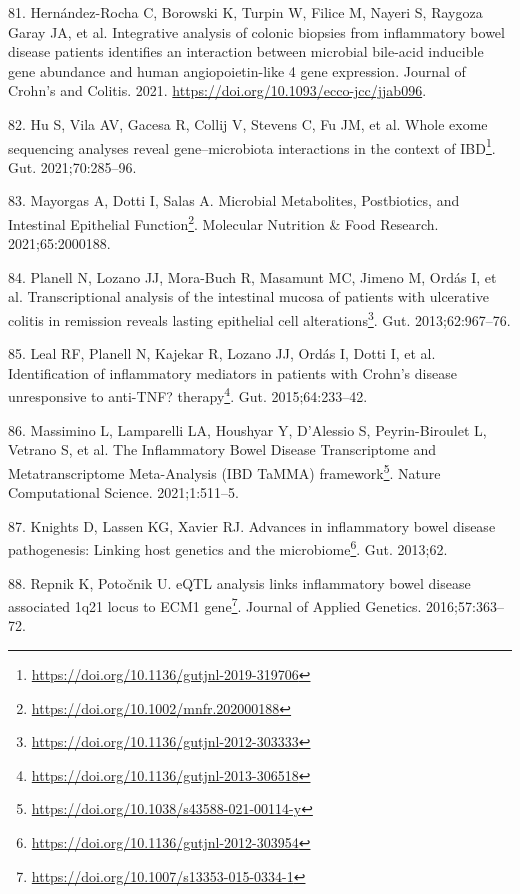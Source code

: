 \documentclass[
  a4paper,
]{book}
\DeclareRobustCommand{\href}[2]{#2\footnote{\url{#1}}}
\newlength{\cslhangindent}
\newlength{\cslentryspacingunit} %
\newenvironment{CSLReferences}[2] %
 {%
  \setlength{\parindent}{0pt}
  \ifodd #1
  \let\oldpar\par
  \def\par{\hangindent=\cslhangindent\oldpar}
  \fi
  \setlength{\parskip}{#2\cslentryspacingunit}
 }%
 {}
\begin{document}
\begin{CSLReferences}{0}{0}
\leavevmode{}%
81. Hernández-Rocha C, Borowski K, Turpin W, Filice M, Nayeri S, Raygoza Garay JA, et al. Integrative analysis of colonic biopsies from inflammatory bowel disease patients identifies an interaction between microbial bile-acid inducible gene abundance and human angiopoietin-like 4 gene expression. Journal of Crohn's and Colitis. 2021. \url{https://doi.org/10.1093/ecco-jcc/jjab096}.

\leavevmode{}%
82. Hu S, Vila AV, Gacesa R, Collij V, Stevens C, Fu JM, et al. \href{https://doi.org/10.1136/gutjnl-2019-319706}{Whole exome sequencing analyses reveal gene--microbiota interactions in the context of IBD}. Gut. 2021;70:285--96.

\leavevmode{}%
83. Mayorgas A, Dotti I, Salas A. \href{https://doi.org/10.1002/mnfr.202000188}{Microbial Metabolites, Postbiotics, and Intestinal Epithelial Function}. Molecular Nutrition \& Food Research. 2021;65:2000188.

\leavevmode{}%
84. Planell N, Lozano JJ, Mora-Buch R, Masamunt MC, Jimeno M, Ordás I, et al. \href{https://doi.org/10.1136/gutjnl-2012-303333}{Transcriptional analysis of the intestinal mucosa of patients with ulcerative colitis in remission reveals lasting epithelial cell alterations}. Gut. 2013;62:967--76.

\leavevmode{}%
85. Leal RF, Planell N, Kajekar R, Lozano JJ, Ordás I, Dotti I, et al. \href{https://doi.org/10.1136/gutjnl-2013-306518}{Identification of inflammatory mediators in patients with Crohn's disease unresponsive to anti-TNF? therapy}. Gut. 2015;64:233--42.

\leavevmode{}%
86. Massimino L, Lamparelli LA, Houshyar Y, D'Alessio S, Peyrin-Biroulet L, Vetrano S, et al. \href{https://doi.org/10.1038/s43588-021-00114-y}{The Inflammatory Bowel Disease Transcriptome and Metatranscriptome Meta-Analysis (IBD TaMMA) framework}. Nature Computational Science. 2021;1:511--5.

\leavevmode{}%
87. Knights D, Lassen KG, Xavier RJ. \href{https://doi.org/10.1136/gutjnl-2012-303954}{Advances in inflammatory bowel disease pathogenesis: Linking host genetics and the microbiome}. Gut. 2013;62.

\leavevmode{}%
88. Repnik K, Potočnik U. \href{https://doi.org/10.1007/s13353-015-0334-1}{eQTL analysis links inflammatory bowel disease associated 1q21 locus to ECM1 gene}. Journal of Applied Genetics. 2016;57:363--72.


\end{CSLReferences}
\end{document}
